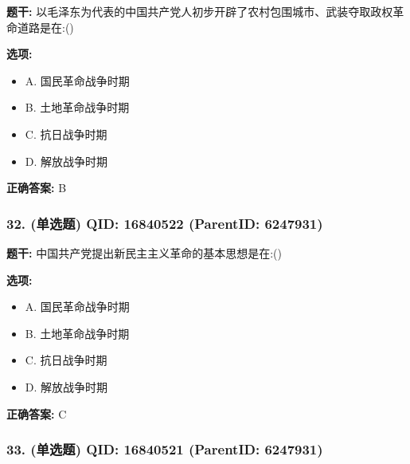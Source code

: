 \documentclass[12pt,UTF8]{ctexart}
\begin{document}
\textbf{题干:}
以毛泽东为代表的中国共产党人初步开辟了农村包围城市、武装夺取政权革命道路是在:()



\textbf{选项:}
\begin{itemize}[leftmargin=*]

  \item A. 国民革命战争时期

  \item B. 土地革命战争时期

  \item C. 抗日战争时期

  \item D. 解放战争时期

\end{itemize}

\textbf{正确答案:}
B

\vspace{0.3em}\hrulefill\vspace{0.7em}

\subsubsection*{32. (单选题) \small QID: 16840522 (ParentID: 6247931)}

\textbf{题干:}
中国共产党提出新民主主义革命的基本思想是在:()



\textbf{选项:}
\begin{itemize}[leftmargin=*]

  \item A. 国民革命战争时期

  \item B. 土地革命战争时期

  \item C. 抗日战争时期

  \item D. 解放战争时期

\end{itemize}

\textbf{正确答案:}
C

\vspace{0.3em}\hrulefill\vspace{0.7em}

\subsubsection*{33. (单选题) \small QID: 16840521 (ParentID: 6247931)}
\end{document}
